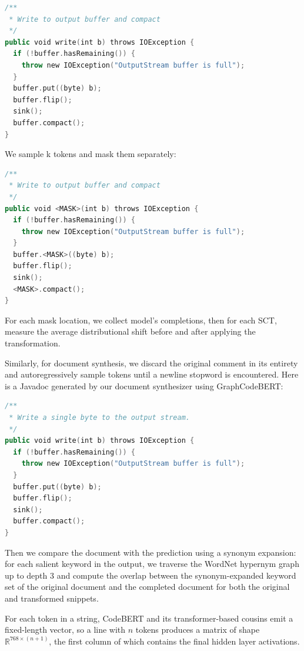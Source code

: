 \documentclass[sigconf,review,anonymous]{acmart}
\begin{document}
  \begin{lstlisting}[basicstyle=\scriptsize\ttfamily, language=kotlin,label={lst:example1}]
/**
 * Write to output buffer and compact
 */
public void write(int b) throws IOException {
  if (!buffer.hasRemaining()) {
    throw new IOException("OutputStream buffer is full");
  }
  buffer.put((byte) b);
  buffer.flip();
  sink();
  buffer.compact();
}
  \end{lstlisting}

  We sample k tokens and mask them separately:

  \begin{lstlisting}[basicstyle=\scriptsize\ttfamily, language=kotlin,label={lst:example2}]
/**
 * Write to output buffer and compact
 */
public void <MASK>(int b) throws IOException {
  if (!buffer.hasRemaining()) {
    throw new IOException("OutputStream buffer is full");
  }
  buffer.<MASK>((byte) b);
  buffer.flip();
  sink();
  <MASK>.compact();
}
  \end{lstlisting}

  For each mask location, we collect model's completions, then for each SCT, measure the average distributional shift before and after applying the transformation.

  Similarly, for document synthesis, we discard the original comment in its entirety and autoregressively sample tokens until a newline stopword is encountered. Here is a Javadoc generated by our document synthesizer using GraphCodeBERT:

  \begin{lstlisting}[basicstyle=\scriptsize\ttfamily, language=kotlin,label={lst:example3}]
/**
 * Write a single byte to the output stream.
 */
public void write(int b) throws IOException {
  if (!buffer.hasRemaining()) {
    throw new IOException("OutputStream buffer is full");
  }
  buffer.put((byte) b);
  buffer.flip();
  sink();
  buffer.compact();
}
  \end{lstlisting}

  Then we compare the document with the prediction using a synonym expansion: for each salient keyword in the output, we traverse the WordNet hypernym graph up to depth 3 and compute the overlap between the synonym-expanded keyword set of the original document and the completed document for both the original and transformed snippets.


For each token in a string, CodeBERT and its transformer-based cousins emit a fixed-length vector, so a line with $n$ tokens produces a matrix of shape $\mathbb R^{768 \times (n + 1)}$, the first column of which contains the final hidden layer activations. %
%
\end{document}
